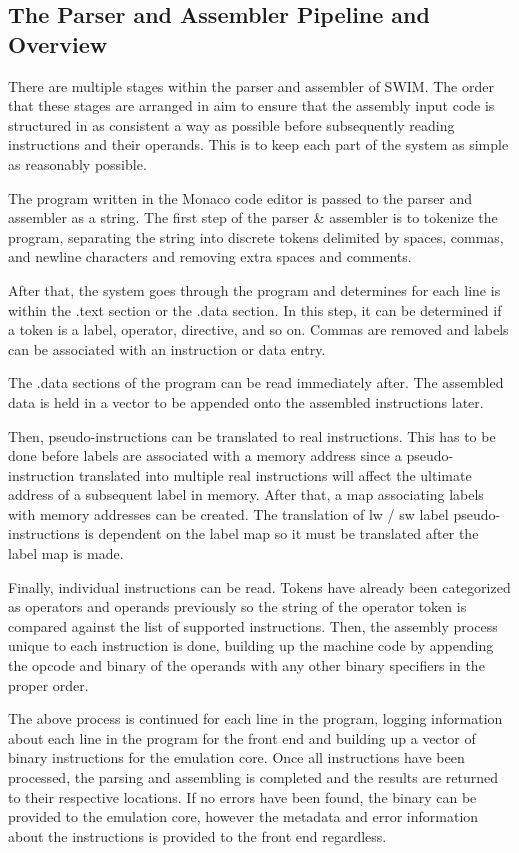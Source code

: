\documentclass[
    paper=letter,
    parskip=half,
    fontsize=12pt,
    titlepage=firstiscover,
    toc=bibliography,
    numbers=endperiod
]{scrartcl}
\begin{document}
\subsection{The Parser and Assembler Pipeline and Overview}

There are multiple stages within the parser and assembler of SWIM. The
order that these stages are arranged in aim to ensure that the assembly
input code is structured in as consistent a way as possible before
subsequently reading instructions and their operands. This is to keep
each part of the system as simple as reasonably possible.

The program written in the Monaco code editor is passed to the parser
and assembler as a string. The first step of the parser \& assembler is
to tokenize the program, separating the string into discrete tokens
delimited by spaces, commas, and newline characters and removing extra
spaces and comments.

After that, the system goes through the program and determines for each
line is within the .text section or the .data section. In this step, it
can be determined if a token is a label, operator, directive, and so on.
Commas are removed and labels can be associated with an instruction or
data entry.

The .data sections of the program can be read immediately after. The
assembled data is held in a vector to be appended onto the assembled
instructions later.

Then, pseudo-instructions can be translated to real instructions. This
has to be done before labels are associated with a memory address since
a pseudo-instruction translated into multiple real instructions will
affect the ultimate address of a subsequent label in memory. After that,
a map associating labels with memory addresses can be created. The
translation of lw / sw label pseudo-instructions is dependent on the
label map so it must be translated after the label map is made.

Finally, individual instructions can be read. Tokens have already been
categorized as operators and operands previously so the string of the
operator token is compared against the list of supported instructions.
Then, the assembly process unique to each instruction is done, building
up the machine code by appending the opcode and binary of the operands
with any other binary specifiers in the proper order.

The above process is continued for each line in the program, logging
information about each line in the program for the front end and
building up a vector of binary instructions for the emulation core. Once
all instructions have been processed, the parsing and assembling is
completed and the results are returned to their respective locations. If
no errors have been found, the binary can be provided to the emulation
core, however the metadata and error information about the instructions
is provided to the front end regardless.
\end{document}
